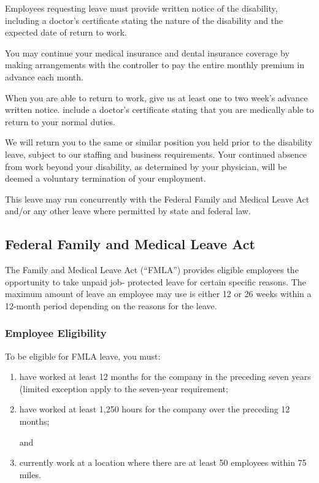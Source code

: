 \documentclass{book}
\begin{document}
Employees requesting leave must provide written notice of the disability, including a doctor's certificate stating the nature of the disability and the expected date of return to work.

You may continue your medical insurance and dental insurance coverage by making arrangements with the controller to pay the entire monthly premium in advance each month.

When you are able to return to work, give us at least one to two week's advance written notice. include a doctor's certificate stating that you are medically able to return to your normal duties.

We will return you to the same or similar position you held prior to the disability leave, subject to our staffing and business requirements. Your continued absence from work beyond your disability, as determined by your physician, will be deemed a voluntary termination of your employment.

This leave may run concurrently with the Federal Family and Medical Leave Act and/or any other leave where permitted by state and federal law.

\subsection{Federal Family and Medical Leave Act}

The Family and Medical Leave Act (“FMLA”) provides eligible employees the opportunity to take unpaid job- protected leave for certain specific reasons. The maximum amount of leave an employee may use is either 12 or 26 weeks within a 12-month period depending on the reasons for the leave.

\subsubsection{Employee Eligibility}

To be eligible for FMLA leave, you must:

\begin{enumerate} \item have worked at least 12 months for the company in the preceding seven years (limited exception apply to the seven-year requirement;

\item have worked at least 1,250 hours for the company over the preceding 12 months;

and

\item currently work at a location where there are at least 50 employees within 75 miles. \end{enumerate}
\end{document}
